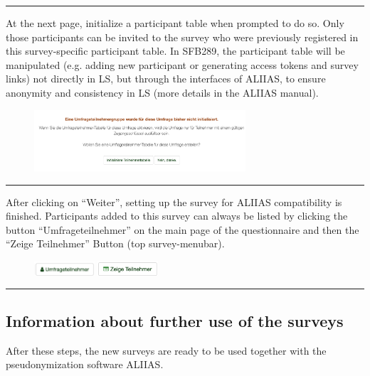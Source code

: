 \par\noindent\rule{\textwidth\color{pniblue}}{0.4pt}
At the next page, initialize a participant table when prompted to do so. Only those participants can be invited to the survey who were previously registered in this survey-specific participant table. In SFB289, the participant table will be manipulated (e.g. adding new participant or generating access tokens and survey links) not directly in LS, but through the interfaces of ALIIAS, to ensure anonymity and consistency in LS (more details in the ALIIAS manual).

\begin{figure}[H]
\includegraphics[width=0.7\textwidth]{docs/fig/ls_sop4.2.png}
\end{figure}

\par\noindent\rule{\textwidth\color{pniblue}}{0.4pt}
After clicking on “Weiter”, setting up the survey for ALIIAS compatibility is finished. Participants added to this survey can always be listed by clicking the button “Umfrageteilnehmer” on the main page of the questionnaire and then the “Zeige Teilnehmer” Button (top survey-menubar). 

\begin{figure}[H]
\includegraphics[width=0.2\textwidth]{docs/fig/ls_sop4_umfrageteilnehmer.png}
\includegraphics[width=0.2\textwidth]{docs/fig/ls_sop4_zeige_teilnehmer.png}
\end{figure}

\par\noindent\rule{\textwidth\color{pniblue}}{0.4pt}
\subsection*{Information about further use of the surveys}
After these steps, the new surveys are ready to be used together with the pseudonymization software ALIIAS.



